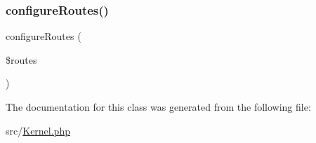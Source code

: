 \mbox{\label{class_app_1_1_kernel_a8208f0c7a8a63568f8bae24547f3a666}} 
\subsubsection{\texorpdfstring{configure\+Routes()}{configureRoutes()}}
{\footnotesize\ttfamily configure\+Routes (\begin{DoxyParamCaption}\item[{Routing\+Configurator}]{\$routes }\end{DoxyParamCaption})\hspace{0.3cm}{\ttfamily [protected]}}



The documentation for this class was generated from the following file\+:\begin{DoxyCompactItemize}
\item 
src/\mbox{\hyperlink{_kernel_8php}{Kernel.\+php}}\end{DoxyCompactItemize}
